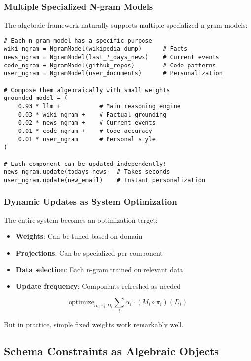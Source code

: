 \documentclass{article}
\theoremstyle{definition}
\begin{document}
\subsubsection{Multiple Specialized N-gram Models}

The algebraic framework naturally supports multiple specialized n-gram models:

\begin{lstlisting}
# Each n-gram model has a specific purpose
wiki_ngram = NgramModel(wikipedia_dump)      # Facts
news_ngram = NgramModel(last_7_days_news)    # Current events
code_ngram = NgramModel(github_repos)        # Code patterns
user_ngram = NgramModel(user_documents)      # Personalization

# Compose them algebraically with small weights
grounded_model = (
    0.93 * llm +           # Main reasoning engine
    0.03 * wiki_ngram +    # Factual grounding
    0.02 * news_ngram +    # Current events
    0.01 * code_ngram +    # Code accuracy
    0.01 * user_ngram      # Personal style
)

# Each component can be updated independently!
news_ngram.update(todays_news)  # Takes seconds
user_ngram.update(new_email)    # Instant personalization
\end{lstlisting}

\subsubsection{Dynamic Updates as System Optimization}

The entire system becomes an optimization target:
\begin{itemize}
    \item \textbf{Weights}: Can be tuned based on domain
    \item \textbf{Projections}: Can be specialized per component
    \item \textbf{Data selection}: Each n-gram trained on relevant data
    \item \textbf{Update frequency}: Components refreshed as needed
\end{itemize}

\begin{equation}
\text{optimize}_{\alpha_i, \pi_i, D_i} \sum_{i} \alpha_i \cdot (M_i \circ \pi_i)(D_i)
\end{equation}

But in practice, simple fixed weights work remarkably well.

\subsection{Schema Constraints as Algebraic Objects}
\end{document}
